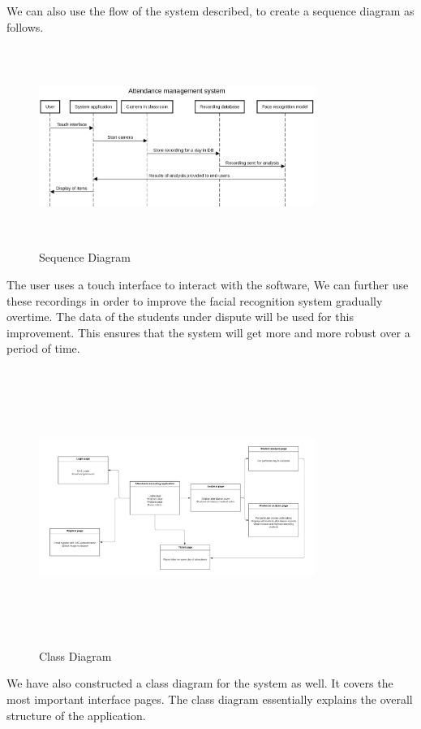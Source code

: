 \documentclass[conference]{IEEEtran}
\begin{document}
We can also use the flow of the system described, to create a sequence diagram as follows.
\begin{figure}[h]
    \centering
    \includegraphics[height=6.5cm,width=9cm]{images/sequencediagram.jpeg}
    \caption{Sequence Diagram}
    \label{fig:my_label}
\end{figure}
The user uses a touch interface to interact with the software, We can further use these recordings in order to improve the facial recognition system gradually overtime.
The data of the students under dispute will be used for this improvement. This ensures that the system will get more and more robust over a period of time.

\begin{figure}[h]
    \centering
    \includegraphics[height=9cm,width=9cm]{images/classdiagram.jpeg}
    \caption{Class Diagram}
    \label{fig:my_label}
\end{figure}
We have also constructed a class diagram for the system as well. It covers the most important interface pages. The class diagram essentially explains 
the overall structure of the application.
\end{document}
